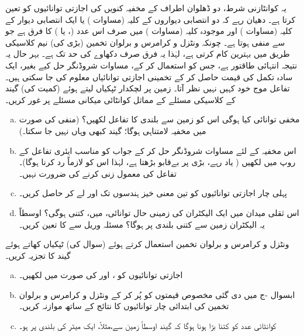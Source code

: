  یہ کوانٹازنی شرط، دو ڈھلوان اطراف کے  مخفیہ کنویں کی اجازتی توانائیوں کو تعین کرتا ہے۔ دھیان رہے کہ دو انتصابی دیواروں کے کلیہ (مساوات ) یا ایک انتصابی دیوار کے کلیہ (مساوات ) اور موجودہ کلیہ (مساوات ) میں صرف اس عدد (،  یا ) کا فرق ہے جو  سے منفی ہوتا ہے۔ چونکہ ونٹزل و کرامرس و برلوان تخمین (بڑی  کی) نیم کلاسیکی طریق میں بہترین کام کرتی ہے، لہٰذا یہ فرق صرف دکھاوے کی حد تک ہے۔ بہر حال یہ نتیجہ انتہائی طاقتور ہے، جس کو استعمال کر کے، مساوات شروڈنگر حل کیے بغیر، ایک سادہ تکمل کی قیمت حاصل کر کے تخمینی اجازتی توانائیاں معلوم کی جا سکتی ہیں۔ تفاعل موج خود کہیں نہیں نظر آتا۔
زمین پر لچکدار ٹپکیاں لیتے ہوئے (کمیت  کی) گیند کے کلاسیکی مسئلے کے مماثل کوانٹائی میکانی مسئلے پر غور کریں۔
\begin{enumerate}[a.]
\item
 مخفی توانائی کیا ہوگی اس کو زمین سے بلندی  کا تفاعل لکھیں؟ (منفی  کی صورت میں مخفیہ لامتناہی ہوگا؛ گیند کبھی وہاں نہیں جا سکتا۔)
\item
 اس مخفیہ کے لئے مساوات شروڈنگر حل کر کے جواب کو مناسب ایئری تفاعل کے روپ میں لکھیں ( یاد رہے، بڑی  پر  بےقابو بڑھتا ہے، لہٰذا اس کو لازماً رد کرنا ہوگا)۔ تفاعل  کی معمول زنی کرنے کی ضرورت نہیں۔
\item
 پہلی چار اجازتی توانائیوں کو تین معنی خیز ہندسوں تک  اور  لے کر حاصل کریں۔
\item
 اس ثقلی میدان میں ایک الیکٹران کی زمینی حال توانائی،  میں، کتنی ہوگی؟ اوسطاً یہ الیکٹران زمین سے کتنی بلندی پر ہوگا؟  مسئلہ وریل سے  کا تعین کریں۔
 \end{enumerate}
 ونٹزل و کرامرس و برلوان تخمین استعمال کرتے ہوئے (سوال  کی) ٹپکیاں کھاتے ہوئے گیند کا تجزیہ کریں۔
\begin{enumerate}[a.]
\item
 اجازتی توانائیوں  کو ،  اور  کی صورت میں لکھیں۔
\item
 ابسوال -ج میں دی گئی مخصوص قیمتوں کو پُر کر کے ونٹزل و کرامرس و برلوان تخمین کی ابتدائی چار توانائیوں کا  نتائج کے ساتھ موازنہ کریں۔
\item
کوانٹائی عدد  کو کتنا بڑا ہونا ہوگا کہ گیند اوسطاً زمین سے،مثلاً، ایک میٹر کی بلندی پر ہو۔
\end{enumerate}
